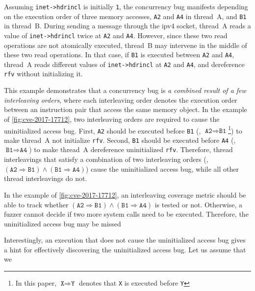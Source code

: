 Assuming \texttt{inet->hdrincl} is initially \texttt{1}, the
concurrency bug manifests depending on the execution order of three
memory accesses, \texttt{A2} and \texttt{A4} in thread~A, and
\texttt{B1} in thread~B.
%
During sending a message through the ipv4 socket, thread~A reads a
value of \texttt{inet->hdrincl} twice at \texttt{A2} and \texttt{A4}.
%
However, since these two read operations are not atomically executed,
thread~B may intervene in the middle of these two read operations.
%
In that case, if \texttt{B1} is executed between \texttt{A2} and
\texttt{A4}, thread~A reads different values of \texttt{inet->hdrincl}
at \texttt{A2} and \texttt{A4}, and dereference \texttt{rfv} without
initializing it.


%
This example demonstrates that a concurrency bug is \textit{a combined
  result of a few interleaving orders}, where each interleaving order
denotes the execution order between an instruction pair that access
the same memory object.
%
In the example of \autoref{fig:cve-2017-17712}, two interleaving orders
are required to cause the uninitialized access bug.
%
First, \texttt{A2} should be executed before \texttt{B1} (\ie,
$\texttt{A2} \Rightarrow \texttt{B1}$\footnote{In this paper,
  $\texttt{X} \Rightarrow \texttt{Y}$ denotes that \texttt{X} is
  executed before \texttt{Y}}) to make thread~A not initialize
\texttt{rfv}.
%
Second, \texttt{B1} should be executed before \texttt{A4} (\ie,
$\texttt{B1} \Rightarrow \texttt{A4}$) to make thread~A dereference
uninitialized \texttt{rfv}.
%
Therefore, thread interleavings that satisfy a combination of two interleaving orders (\ie,
$(\texttt{A2} \Rightarrow \texttt{B1}) \wedge (\texttt{B1} \Rightarrow
\texttt{A4})$) cause the uninitialized access bug, while
all other thread interleavings do not.


%

In the example of \autoref{fig:cve-2017-17712}, an
interleaving coverage metric should be able to track whether
$(\texttt{A2} \Rightarrow \texttt{B1}) \wedge (\texttt{B1} \Rightarrow
\texttt{A4})$ is tested or not.
%
Otherwise, a fuzzer cannot decide if two more system calls need to be executed.
Therefore, the uninitialized access bug may be missed 


%
Interestingly, an execution that does not cause the uninitialized access bug gives a hint for effectively discovering the uninitialized access bug.
%
Let us assume that we 

